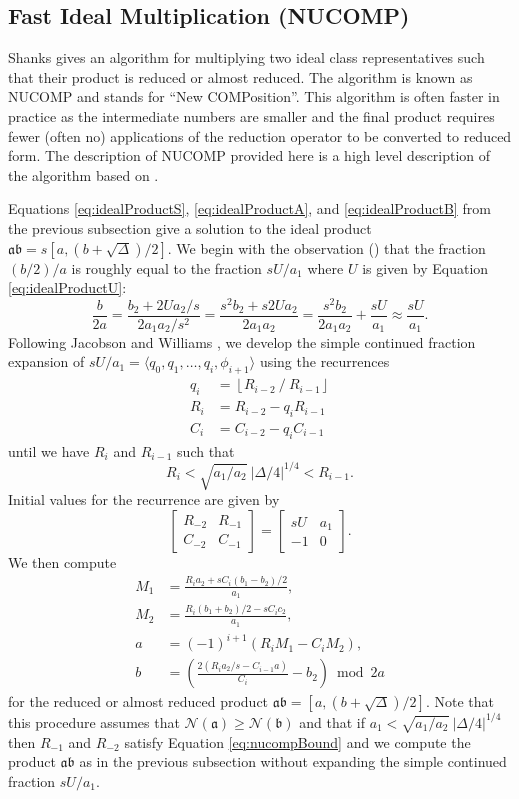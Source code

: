 \documentclass{ucalgthes1}
\theoremstyle{definition}
\newcommand{\matrixtt}[4]{\left[ \begin{array}{rr} #1 & #2 \\ #3 & #4 \end{array} \right]}
\newcommand{\floor}[1]{\left\lfloor #1 \right\rfloor}
\begin{document}
\subsection{Fast Ideal Multiplication (NUCOMP)}
\label{subsec:nucomp}

Shanks \cite{Shanks1989} gives an algorithm for multiplying two ideal class representatives such that their product is reduced or almost reduced.  The algorithm is known as NUCOMP and stands for ``New COMPosition''.  This algorithm is often faster in practice as the intermediate numbers are smaller and the final product requires fewer (often no) applications of the reduction operator to be converted to reduced form. The description of NUCOMP provided here is a high level description of the algorithm based on \cite[pp.119-123]{Jacobson2009}.

Equations \ref{eq:idealProductS}, \ref{eq:idealProductA}, and \ref{eq:idealProductB} from the previous subsection give a solution to the ideal product $\mathfrak a \mathfrak b = s[a, (b+\sqrt\Delta)/2]$.  We begin with the observation (\cite[p.119]{Jacobson2009}) that the fraction $(b/2)/a$ is roughly equal to the fraction $sU / a_1$ where $U$ is given by Equation \ref{eq:idealProductU}:
\[
	\frac{b}{2a} = \frac{b_2 + 2Ua_2/s}{2a_1a_2/s^2} 
	= \frac{s^2 b_2+s2Ua_2}{2a_1a_2}
	= \frac{s^2b_2}{2a_1a_2} + \frac{sU}{a_1}
	\approx \frac{sU}{a_1}.
\]
Following Jacobson and Williams \cite[pp.120-121]{Jacobson2009}, we develop the simple continued fraction expansion of $sU/a_1 = \langle q_0, q_1, \dots, q_i, \phi_{i+1} \rangle$ using the recurrences
\begin{align*}
	q_i &= \floor{R_{i-2} ~/~ R_{i-1}} \\
	R_i &= R_{i-2} - q_i R_{i-1} \\
	C_i &= C_{i-2} - q_i C_{i-1}
\end{align*}
until we have $R_i$ and $R_{i-1}$ such that
\begin{equation}
\label{eq:nucompBound}
	R_i < \sqrt{a_1/a_2} ~ |\Delta/4|^{1/4} < R_{i-1}.
\end{equation}
Initial values for the recurrence are given by
\[
	\matrixtt{R_{-2}}{R_{-1}}{C_{-2}}{C_{-1}} = \matrixtt{sU}{a_1}{-1}{0}.
\]
We then compute
\begin{align*}
	M_1 &= \frac{R_i a_2 + sC_i(b_1-b_2)/2}{a_1}, \\
	M_2 &= \frac{R_i (b_1+b_2)/2 - s C_i c_2}{a_1}, \\
	a &= (-1)^{i+1} (R_i M_1  - C_i M_2), \\
	b &= \left( \frac{2(R_i a_2 /s - C_{i-1} a)}{C_i} - b_2 \right) \bmod 2a
\end{align*}
for the reduced or almost reduced product $\mathfrak a \mathfrak b = [a, (b + \sqrt\Delta)/2]$.  Note that this procedure assumes that $\mathcal N(\mathfrak a) \ge \mathcal N(\mathfrak b)$ and that if $a_1 < \sqrt{a_1/a_2} ~ |\Delta/4|^{1/4}$ then $R_{-1}$ and $R_{-2}$ satisfy Equation \ref{eq:nucompBound} and we compute the product $\mathfrak a \mathfrak b$ as in the previous subsection without expanding the simple continued fraction $sU/a_1$.
\end{document}

